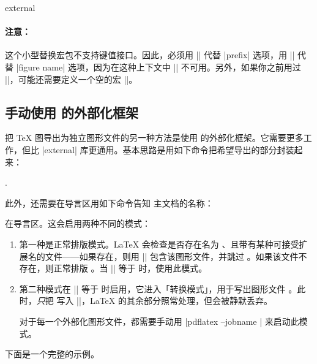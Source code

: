 {\begin{pgfplotslibrary}{external}
    \paragraph{注意：}

    这个小型替换宏包不支持键值接口。因此，必须用 || 代替 |prefix| 选项，用 || 代替 |figure name| 选项，因为在这种上下文中 |\tikzset| 不可用。另外，如果你之前用过 |\pgfplotsset|，可能还需要定义一个空的宏 |\pgfplotsset|。
\end{pgfplotslibrary}


\subsection[手动使用 PGF 外部化框架]{手动使用 {\normalfont\pgfname} 的外部化框架}

把 \TeX{} 图导出为独立图形文件的另一种方法是使用 \pgfname{} 的外部化框架。它需要更多工作，但比 |external| 库更通用。基本思路是用如下命令把希望导出的部分封装起来：

\declareandlabel{\beginpgfgraphicnamed}


\declareandlabel{\endpgfgraphicnamed}.

\noindent 此外，还需要在导言区用如下命令告知 \pgfname{} 主文档的名称：

\declareandlabel{\pgfrealjobname}

\noindent 在导言区。这会启用两种不同的模式：
%
\begin{enumerate}
    \item 第一种是正常排版模式。\LaTeX{} 会检查是否存在名为 、且带有某种可接受扩展名的文件——如果存在，则用 |\pgfimage| 包含该图形文件，并跳过 。如果该文件不存在，则正常排版 。当 |\jobname| 等于  时，使用此模式。
    \item 第二种模式在 |\jobname| 等于  时启用，它进入「转换模式」，用于写出图形文件 。此时，\emph{只}把  写入 |\jobname|，\LaTeX{} 的其余部分照常处理，但会被静默丢弃。

        对于每一个外部化图形文件，都需要手动用
        |pdflatex --jobname | 来启动此模式。
\end{enumerate}
%
下面是一个完整的示例。
%
}

